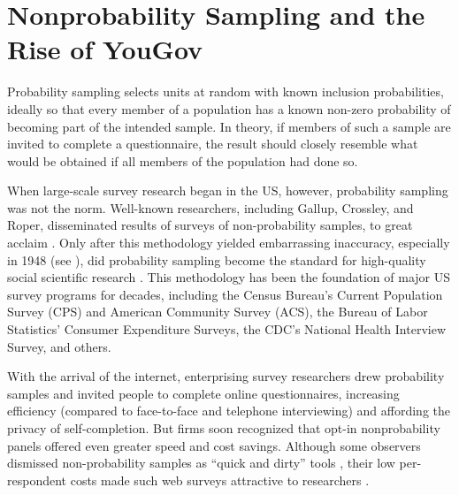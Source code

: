 \documentclass[12pt]{article}
\begin{document}
\section*{Nonprobability Sampling and the Rise of YouGov}

Probability sampling selects units at random with known inclusion probabilities, ideally so that every member of a population has a known non-zero probability of becoming part of the intended sample. In theory, if members of such a sample are invited to complete a questionnaire, the result should closely resemble what would be obtained if all members of the population had done so.  


When large-scale survey research began in the US, however, probability sampling was not the norm. Well-known researchers, including Gallup, Crossley, and Roper, disseminated results of surveys of non-probability samples, to great acclaim \parencite{crossley_straw_1937}. Only after this methodology yielded embarrassing inaccuracy, especially in 1948 (see \cite{mosteller_pre_election_1949}), did probability sampling become the standard for high-quality social scientific research \parencite{cornesse_review_2020}. This methodology has been the foundation of major US survey programs for decades, including the Census Bureau’s Current Population Survey (CPS) and American Community Survey (ACS), the Bureau of Labor Statistics’ Consumer Expenditure Surveys, the CDC’s National Health Interview Survey, and others. 

With the arrival of the internet, enterprising survey researchers drew probability samples and invited people to complete online questionnaires, increasing efficiency (compared to face-to-face and telephone interviewing) and affording the privacy of self-completion. But firms soon recognized that opt-in nonprobability panels offered even greater speed and cost savings. Although some observers dismissed non-probability samples as “quick and dirty” tools \parencite{bethlehem_selection_2010}, their low per-respondent costs made such web surveys attractive to researchers \parencite{wright_researching_2005}.
\end{document}
